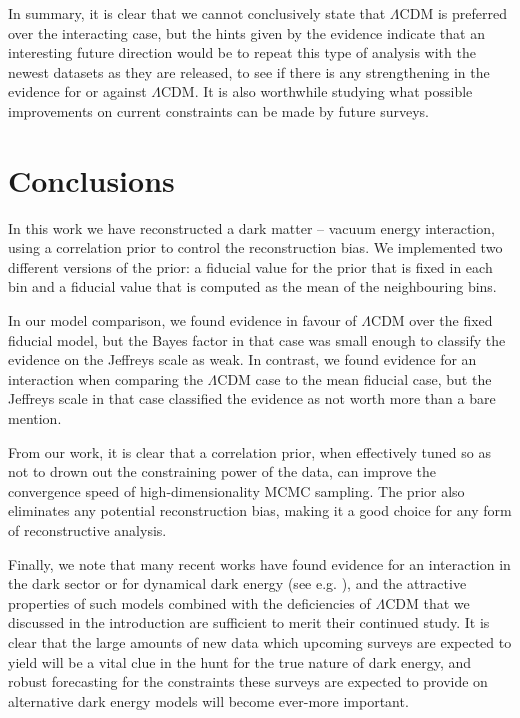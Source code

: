 \documentclass[final,3p,times,twocolumn]{elsarticle}
\begin{document}
In summary, it is clear that we cannot conclusively state that $\Lambda$CDM is preferred over the interacting case, but the hints given by the evidence indicate that an interesting future direction would be to repeat this type of analysis with the newest datasets as they are released, to see if there is any strengthening in the evidence for or against $\Lambda$CDM. It is also worthwhile studying what possible improvements on current constraints can be made by future surveys.

\section{Conclusions} \label{sec:conclusions}
In this work we have reconstructed a dark matter -- vacuum energy interaction, using a correlation prior to control the reconstruction bias. We implemented two different versions of the prior: a fiducial value for the prior that is fixed in each bin and a fiducial value that is computed as the mean of the neighbouring bins.

In our model comparison, we found evidence in favour of $\Lambda$CDM over the fixed fiducial model, but the Bayes factor in that case was small enough to classify the evidence on the Jeffreys scale as weak. In contrast, we found evidence for an interaction when comparing the $\Lambda$CDM case to the mean fiducial case, but the Jeffreys scale in that case classified the evidence as not worth more than a bare mention.

From our work, it is clear that a correlation prior, when effectively tuned so as not to drown out the constraining power of the data, can improve the convergence speed of high-dimensionality MCMC sampling. The prior also eliminates any potential reconstruction bias, making it a good choice for any form of reconstructive analysis.

Finally, we note that many recent works have found evidence for an interaction in the dark sector or for dynamical dark energy (see e.g. \cite{Zhao:2017cud, Wang:2018fng, Yang:2018qmz, Yang:2018qec, Lucca:2020zjb}), and the attractive properties of such models combined with the deficiencies of $\Lambda$CDM that we discussed in the introduction are sufficient to merit their continued study. It is clear that the large amounts of new data which upcoming surveys are expected to yield will be a vital clue in the hunt for the true nature of dark energy, and robust forecasting for the constraints these surveys are expected to provide on alternative dark energy models will become ever-more important.
\end{document}
